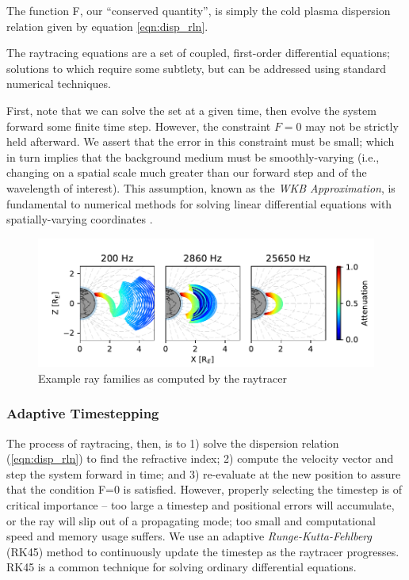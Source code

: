 The function F, our ``conserved quantity'', is simply the cold plasma dispersion relation given by equation \ref{eqn:disp_rln}.

The raytracing equations are a set of coupled, first-order differential equations; solutions to which require some subtlety, but can be addressed using standard numerical techniques.

First, note that we can solve the set at a given time, then evolve the system forward some finite time step. However, the constraint $F=0$ may not be strictly held afterward. We assert that the error in this constraint must be small; which in turn implies that the background medium must be smoothly-varying (i.e., changing on a spatial scale much greater than our forward step and of the wavelength of interest). This assumption, known as the \emph{WKB Approximation}, is fundamental to numerical methods for solving linear differential equations with spatially-varying coordinates \cite{WKB}.

\begin{figure}[ht]
\begin{center}
\includegraphics{Figures/raytracing_example.pdf}
\end{center}
\caption[Example ray tracing]{Example ray families as computed by the raytracer}
\label{fig:raytracing_example}
\end{figure}
\subsubsection{Adaptive Timestepping}
The process of raytracing, then, is to 1) solve the dispersion relation (\ref{eqn:disp_rln}) to find the refractive index; 2) compute the velocity vector and step the system forward in time; and 3) re-evaluate at the new position to assure that the condition F=0 is satisfied. However, properly selecting the timestep is of critical importance -- too large a timestep and positional errors will accumulate, or the ray will slip out of a propagating mode; too small and computational speed and memory usage suffers. We use an adaptive \emph{Runge-Kutta-Fehlberg} (RK45) \citep{Fehlberg1969, Mathews2004} method to continuously update the timestep as the raytracer progresses. RK45 is a common technique for solving ordinary differential equations.

